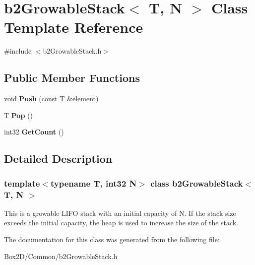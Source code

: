 \hypertarget{classb2_growable_stack}{}\section{b2\+Growable\+Stack$<$ T, N $>$ Class Template Reference}
\label{classb2_growable_stack}


{\ttfamily \#include $<$b2\+Growable\+Stack.\+h$>$}

\subsection*{Public Member Functions}
\begin{DoxyCompactItemize}
\item 
\mbox{\label{classb2_growable_stack_a23661327d64ff72d1ec8d6bcdb6d8992}} 
void {\bfseries Push} (const T \&element)
\item 
\mbox{\label{classb2_growable_stack_a53e53dcd6bff8308405a881f02957bc8}} 
T {\bfseries Pop} ()
\item 
\mbox{\label{classb2_growable_stack_a3049e76ba7182b988450bfe94d30d5aa}} 
int32 {\bfseries Get\+Count} ()
\end{DoxyCompactItemize}


\subsection{Detailed Description}
\subsubsection*{template$<$typename T, int32 N$>$\newline
class b2\+Growable\+Stack$<$ T, N $>$}

This is a growable L\+I\+FO stack with an initial capacity of N. If the stack size exceeds the initial capacity, the heap is used to increase the size of the stack. 

The documentation for this class was generated from the following file\+:\begin{DoxyCompactItemize}
\item 
Box2\+D/\+Common/b2\+Growable\+Stack.\+h\end{DoxyCompactItemize}
